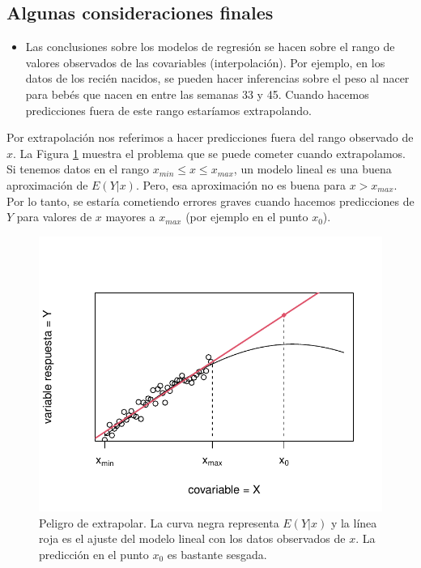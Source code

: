 \documentclass[
]{article}
\providecommand{\tightlist}{%
  \setlength{\itemsep}{0pt}\setlength{\parskip}{0pt}}
\begin{document}
\hypertarget{algunas-consideraciones-finales}{%
\subsection{Algunas consideraciones finales}\label{algunas-consideraciones-finales}}

\begin{itemize}
\tightlist
\item
  Las conclusiones sobre los modelos de regresión se hacen sobre el rango de valores observados de las covariables (interpolación). Por ejemplo, en los datos de los recién nacidos, se pueden hacer inferencias sobre el peso al nacer para bebés que nacen en entre las semanas 33 y 45. Cuando hacemos predicciones fuera de este rango estaríamos extrapolando.
\end{itemize}

Por extrapolación nos referimos a hacer predicciones fuera del rango observado de \(x\). La Figura \ref{fig:extrapolacion} muestra el problema que se puede cometer cuando extrapolamos. Si tenemos datos en el rango \(x_{min} \leq x \leq x_{max}\), un modelo lineal es una buena aproximación de \(E(Y|x)\). Pero, esa aproximación no es buena para \(x>x_{max}\). Por lo tanto, se estaría cometiendo errores graves cuando hacemos predicciones de \(Y\) para valores de \(x\) mayores a \(x_{max}\) (por ejemplo en el punto \(x_{0}\)).

\begin{figure}

{\centering \includegraphics{MLG1_files/figure-latex/extrapolacion-1} 

}

\caption{Peligro de extrapolar. La curva negra representa $E(Y|x)$ y la línea roja es el ajuste del modelo lineal con los datos observados de $x$. La predicción en el punto $x_{0}$ es bastante sesgada.}\label{fig:extrapolacion}
\end{figure}
\end{document}
